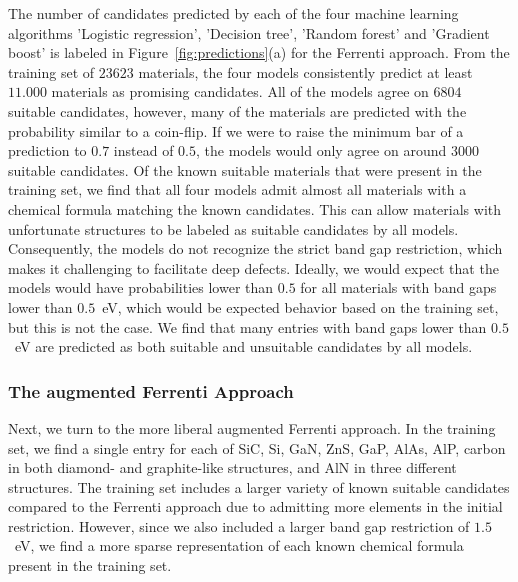 \documentclass[superscriptaddress,unsortedaddress,
 amsmath,amssymb,
 aps,
]{revtex4-2}
\begin{document}
The number of candidates predicted by each of the four machine learning algorithms 'Logistic regression', 'Decision tree', 'Random forest' and 'Gradient boost' is labeled in Figure~\ref{fig:predictions}(a) for the Ferrenti approach. 
From the training set of $23623$ materials, the four models consistently predict at least $11.000$ materials as promising candidates. All of the models agree on $6804$ suitable candidates, however, many of the materials are predicted with the probability similar to a coin-flip. 
If we were to raise the minimum bar of a prediction to
$0.7$ instead of $0.5$, the models would only agree on around $3000$ suitable candidates. 
Of the known suitable materials that were present in the training set, we find that all four models admit almost all materials with a chemical formula matching the known candidates. This can allow materials with unfortunate structures to be labeled as suitable candidates by all models. Consequently, the models do not recognize the strict band gap restriction, which makes it challenging to facilitate deep defects. Ideally, we would expect that the models would have probabilities lower than $0.5$ for all materials with band gaps lower than $0.5$~eV, which would be expected behavior based on the training set, but this is not the case. We find that many entries with band gaps lower than $0.5$~eV are predicted as both suitable and unsuitable candidates by all models. 

\subsubsection*{The augmented Ferrenti Approach}

Next, we turn to the more liberal augmented Ferrenti approach. In the training set, we find a single entry for each of SiC, Si, GaN, ZnS, GaP, AlAs, AlP, carbon in both diamond- and graphite-like structures, and AlN in three different structures. The training set includes a larger variety of known suitable candidates compared to the Ferrenti approach due to admitting more elements in the initial restriction. However, since we also included a larger band gap restriction of $1.5$~eV, we find a more sparse representation of each known chemical formula present in the training set.
\end{document}
